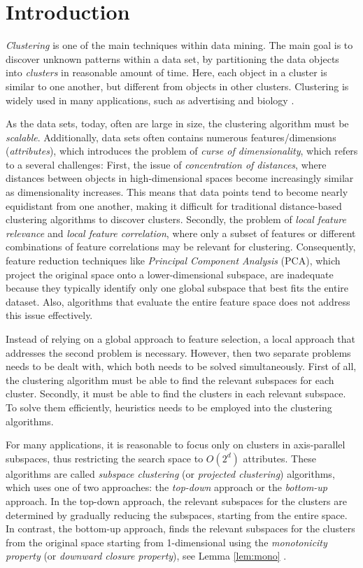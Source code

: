 \section{Introduction}
\textit{Clustering} is one of the main techniques within data mining. The main goal is to discover unknown patterns within a data set, by partitioning the data objects into \textit{clusters} in reasonable amount of time. Here, each object in a cluster is similar to one another, but different from objects in other clusters. Clustering is widely used in many applications, such as advertising and biology \cite[p.~444]{han-2011}.

As the data sets, today, often are large in size, the clustering algorithm must be \textit{scalable}. Additionally, data sets often contains numerous features/dimensions (\textit{attributes}), which introduces the problem of \textit{curse of dimensionality}, which refers to a several challenges: First, the issue of \textit{concentration of distances}, where distances between objects in high-dimensional spaces become increasingly similar as dimensionality increases. This means that data points tend to become nearly equidistant from one another, making it difficult for traditional distance-based clustering algorithms to discover clusters. Secondly, the problem of \textit{local feature relevance} and \textit{local feature correlation}, where only a subset of features or different combinations of feature correlations may be relevant for clustering. Consequently, feature reduction techniques like \textit{Principal Component Analysis} (PCA), which project the original space onto a lower-dimensional subspace, are inadequate because they typically identify only one global subspace that best fits the entire dataset. Also, algorithms that evaluate the entire feature space does not address this issue effectively. \cite[p.~43--46]{kriegel-2009}

Instead of relying on a global approach to feature selection, a local approach that addresses the second problem is necessary. However, then two separate problems needs to be dealt with, which both needs to be solved simultaneously. First of all, the clustering algorithm must be able to find the relevant subspaces for each cluster. Secondly, it must be able to find the clusters in each relevant subspace. To solve them efficiently, heuristics needs to be employed into the clustering algorithms. \cite[p.~6--7]{kriegel-2009}

For many applications, it is reasonable to focus only on clusters in axis-parallel subspaces, thus restricting the search space to $O(2^d)$ attributes. These algorithms are called \textit{subspace clustering} (or \textit{projected clustering}) algorithms, which uses one of two approaches: the \textit{top-down} approach or the \textit{bottom-up} approach. In the top-down approach, the relevant subspaces for the clusters are determined by gradually reducing the subspaces, starting from the entire space. In contrast, the bottom-up approach, finds the relevant subspaces for the clusters from the original space starting from 1-dimensional using the \textit{monotonicity property} (or \textit{downward closure property}), see Lemma \ref{lem:mono} \cite{clique}. \cite[p.~8,~11]{kriegel-2009}

